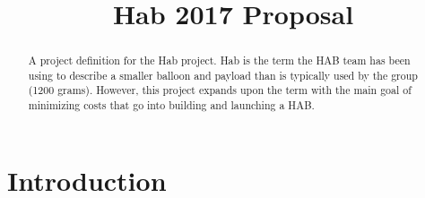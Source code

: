 \documentclass[conference]{IEEEtran} %
\title{\textmu{}Hab 2017 Proposal}
\author{
  \IEEEauthorblockN{%
    Austin~Bodzas\IEEEauthorrefmark{1}
  }
  \IEEEauthorblockA{%
    RIT Space Exploration, Rochester Institute of Technology \\ %
    Rochester, N.Y. \\
    Email:
    \IEEEauthorrefmark{1}abb6499@rit.edu
  }
}
\begin{document}
\maketitle%

\begin{abstract}

    A project definition for the \textmu{}Hab project.  \textmu{}Hab is the term the
    HAB team has been using to describe a smaller balloon and payload than is
    typically used by the group (1200 grams). However, this project expands upon
    the term with the main goal of minimizing costs that go into building and
    launching a HAB.\@
\end{abstract}
\label{sec:nomenclature}
\newcommand{\nomunit}[1]{%
\renewcommand{\nomentryend}{\hspace*{\fill}#1}}
\renewcommand{\nompreamble}{}
\printnomenclature{}



\section{Introduction}
\label{sec:introduction}
\end{document}
